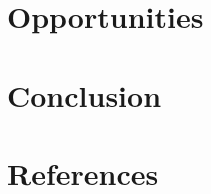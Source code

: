 \documentclass[final,5p,times,twocolumn]{elsarticle}
\begin{document}
\section{Opportunities}
\label{opportunities}


\section{Conclusion}
\label{conclusion}


\section{References}


\end{document}
